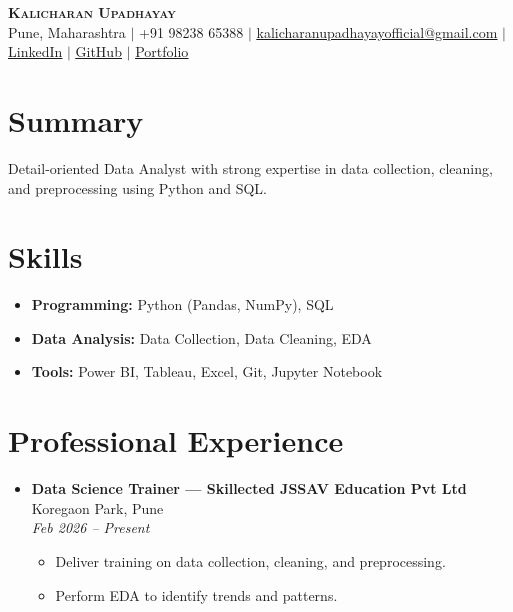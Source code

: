 \documentclass[letterpaper,10.8pt]{article}
\begin{document}
\begin{center}
    \textbf{\Huge \scshape Kalicharan Upadhayay} \\ \vspace{1pt}
    \small Pune, Maharashtra $|$ +91 98238 65388 $|$ \href{mailto:kalicharanupadhayayofficial@gmail.com}{\underline{kalicharanupadhayayofficial@gmail.com}} $|$ \href{https://www.linkedin.com/in/kalicharan-upadhayay-2637b4324}{\underline{LinkedIn}} $|$ \href{https://github.com/akashupadhayay106-au}{\underline{GitHub}} $|$ \href{https://akashupadhayay106-au.github.io/portfolio}{\underline{Portfolio}}
\end{center}

\section{Summary}
Detail-oriented Data Analyst with strong expertise in data collection, cleaning, and preprocessing using Python and SQL.

\section{Skills}
\begin{itemize}[leftmargin=0.15in]
    \item \textbf{Programming:} Python (Pandas, NumPy), SQL
    \item \textbf{Data Analysis:} Data Collection, Data Cleaning, EDA
    \item \textbf{Tools:} Power BI, Tableau, Excel, Git, Jupyter Notebook
\end{itemize}

\section{Professional Experience}
\begin{itemize}[leftmargin=0.15in, label={}]

    \item
    \textbf{Data Science Trainer --- Skillected JSSAV Education Pvt Ltd} \hfill Koregaon Park, Pune \\
    \textit{Feb 2026 -- Present}
    \begin{itemize}
        \item Deliver training on data collection, cleaning, and preprocessing.
        \item Perform EDA to identify trends and patterns.
    \end{itemize}

\end{itemize}
\end{document}
